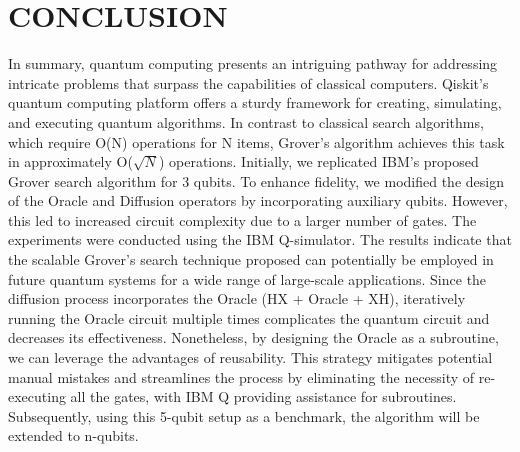 \documentclass[conference]{IEEEtran}
\begin{document}
\section{CONCLUSION}
In summary, quantum computing presents an intriguing
pathway for addressing intricate problems that surpass the capabilities of classical computers. Qiskit’s quantum computing
platform offers a sturdy framework for creating, simulating,
and executing quantum algorithms. In contrast to classical
search algorithms, which require O(N) operations for N
items, Grover’s algorithm achieves this task in approximately
O($\sqrt{N} $) operations. Initially, we replicated IBM’s proposed
Grover search algorithm for 3 qubits. To enhance fidelity, we
modified the design of the Oracle and Diffusion operators by
incorporating auxiliary qubits. However, this led to increased
circuit complexity due to a larger number of gates. The
experiments were conducted using the IBM Q-simulator. The
results indicate that the scalable Grover’s search technique
proposed can potentially be employed in future quantum
systems for a wide range of large-scale applications. Since
the diffusion process incorporates the Oracle (HX + Oracle +
XH), iteratively running the Oracle circuit multiple times complicates the quantum circuit and decreases its effectiveness.
Nonetheless, by designing the Oracle as a subroutine, we can
leverage the advantages of reusability. This strategy mitigates
potential manual mistakes and streamlines the process by
eliminating the necessity of re-executing all the gates, with
IBM Q providing assistance for subroutines. Subsequently,
using this 5-qubit setup as a benchmark, the algorithm will
be extended to n-qubits.
\end{document}
